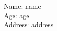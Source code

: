 \documentclass{article}
\begin{document}
Name: {{name}} \\
Age: {{age}} \\
Address: {{address}}
\end{document}
